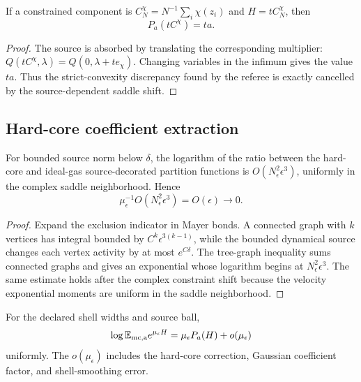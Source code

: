 \begin{corollary}
\label{cor:rr2-b1-test}
If a constrained component is
\(C_N^\chi=N^{-1}\sum_i\chi(z_i)\) and
\(H=tC_N^\chi\), then
\[
 P_a(tC^\chi)=ta.
\]
\end{corollary}

\begin{proof}
The source is absorbed by translating the corresponding multiplier:
\(Q(tC^\chi,\lambda)=Q(0,\lambda+te_\chi)\).  Changing variables in the
infimum gives the value \(ta\).  Thus the strict-convexity discrepancy found
by the referee is exactly cancelled by the source-dependent saddle shift.
\end{proof}

\subsection{Hard-core coefficient extraction}

\begin{lemma}
\label{lem:rr2-b1-hardcore}
For bounded source norm below \(\delta\), the logarithm of the ratio between
the hard-core and ideal-gas source-decorated partition functions is
\(O(N_\epsilon^2\epsilon^3)\), uniformly in the complex saddle
neighborhood.  Hence
\[
 \mu_\epsilon^{-1}
 O(N_\epsilon^2\epsilon^3)=O(\epsilon)\to0.
\]
\end{lemma}

\begin{proof}
Expand the exclusion indicator in Mayer bonds.  A connected graph with
\(k\) vertices has integral bounded by
\(C^k\epsilon^{3(k-1)}\), while the bounded dynamical source changes each
vertex activity by at most \(e^{C\delta}\).  The tree-graph inequality sums
connected graphs and gives an exponential whose logarithm begins at
\(N_\epsilon^2\epsilon^3\).  The same estimate holds after the complex
constraint shift because the velocity exponential moments are uniform in
the saddle neighborhood.
\end{proof}

\begin{theorem}
\label{thm:rr2-b1-coeff}
For the declared shell widths and source ball,
\[
 \log\mathbb E_{\rm mc,a}
 e^{\mu_\epsilon H}
 =
 \mu_\epsilon P_a(H)+o(\mu_\epsilon)
\]
uniformly.  The \(o(\mu_\epsilon)\) includes the hard-core correction,
Gaussian coefficient factor, and shell-smoothing error.
\end{theorem}

